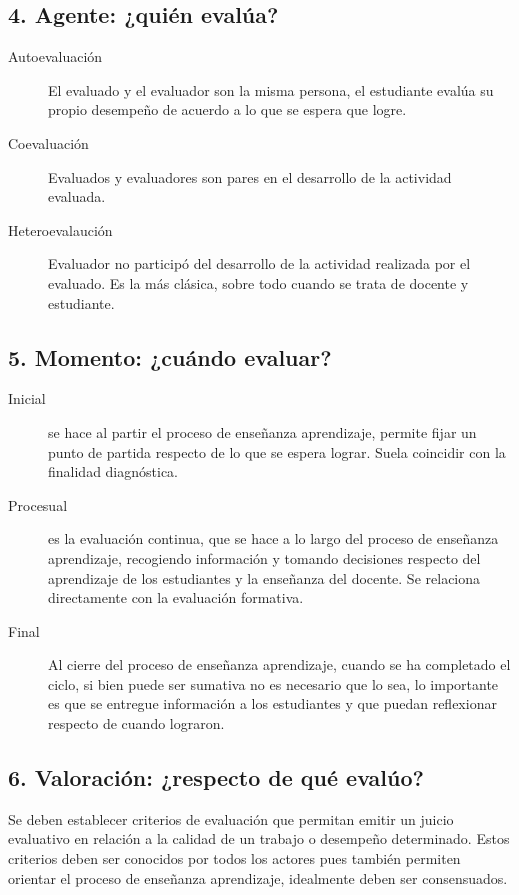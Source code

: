\documentclass[12pt,letterpaper,article,x11names]{memoir}
\begin{document}
\subsection{4. Agente: ¿quién evalúa?}
\label{sec:org3d36a55}
\begin{description}
\item[{Autoevaluación}] El evaluado y el evaluador son la misma persona, el estudiante evalúa su propio desempeño de acuerdo a lo que se espera que logre.
\item[{Coevaluación}] Evaluados y evaluadores son pares en el desarrollo de la actividad evaluada.
\item[{Heteroevalaución}] Evaluador no participó del desarrollo de la actividad realizada por el evaluado. Es la más clásica, sobre todo cuando se trata de docente y estudiante.
\end{description}

\subsection{5. Momento: ¿cuándo evaluar?}
\label{sec:org71bc31b}
\begin{description}
\item[{Inicial}] se hace al partir el proceso de enseñanza aprendizaje, permite fijar un punto de partida respecto de lo que se espera lograr. Suela coincidir con la finalidad diagnóstica.
\item[{Procesual}] es la evaluación continua, que se hace a lo largo del proceso de enseñanza aprendizaje, recogiendo información y tomando decisiones respecto del aprendizaje de los estudiantes y la enseñanza del docente. Se relaciona directamente con la evaluación formativa.
\item[{Final}] Al cierre del proceso de enseñanza aprendizaje, cuando se ha completado el ciclo, si bien puede ser sumativa no es necesario que lo sea, lo importante es que se entregue información a los estudiantes y que puedan reflexionar respecto de cuando lograron.
\end{description}

\subsection{6. Valoración: ¿respecto de qué evalúo?}
\label{sec:orgdd10746}
Se deben establecer criterios de evaluación que permitan emitir un juicio evaluativo en relación a la calidad de un trabajo o desempeño determinado. Estos criterios deben ser conocidos por todos los actores pues también permiten orientar el proceso de enseñanza aprendizaje, idealmente deben ser consensuados.
\end{document}
